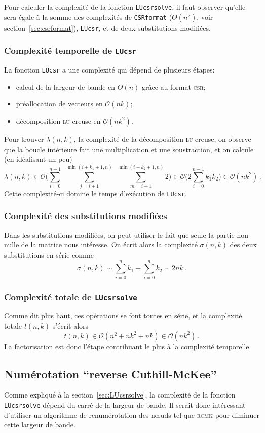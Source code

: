 \documentclass[11pt]{article}
\begin{document}
Pour calculer la complexité de la fonction \lstinline|LUcsrsolve|, il faut observer qu'elle sera égale à la somme des complexités de \lstinline|CSRformat| ($\Theta(n^2)$, voir section~\ref{sec:csrformat}), \lstinline|LUcsr|, et de deux substitutions modifiées.
\subsubsection{Complexité temporelle de \texttt{LUcsr}}
La fonction \lstinline|LUcsr| a une complexité qui dépend de plusieurs étapes:
\begin{itemize}
	\item calcul de la largeur de bande en $\Theta(n)$ grâce au format \textsc{csr};
	\item préallocation de vecteurs en $\mathcal{O}(nk)$;
	\item décomposition \textsc{lu} creuse en $\mathcal{O}(nk^2)$.
\end{itemize}
Pour trouver $\lambda(n, k)$, la complexité de la décomposition \textsc{lu} creuse, on observe que la boucle intérieure fait une multiplication et une soustraction, et on calcule (en idéalisant un peu)
\[
\lambda(n, k) \in \mathcal{O}\bigg(\sum_{i=0}^{n-1}\ \  \sum_{j = i+1}^{\min(i+k_1+1, n)} \ \ \sum_{m = i+1}^{\min(i+k_2+1, n)} 2\bigg) \in \mathcal{O}\bigg(2 \sum_{i=0}^{n-1} k_1 k_2\bigg) \in  \mathcal{O}(n k^2)\,.
\]
Cette complexité-ci domine le temps d'exécution de \lstinline|LUcsr|.
\subsubsection{Complexité des substitutions modifiées}
Dans les substitutions modifiées, on peut utiliser le fait que seule la partie non nulle de la matrice nous intéresse. On écrit alors la complexité $\sigma(n, k)$ des deux substitutions en série comme
\[
\sigma(n, k) \sim \sum_{i=0}^{n} k_1 + \sum_{i=0}^{n} k_2 \sim 2nk\,.
\]
\subsubsection{Complexité totale de \texttt{LUcsrsolve}}
Comme dit plus haut, ces opérations se font toutes en série, et la complexité totale $t(n, k)$ s'écrit alors
\[
t(n, k) \in \mathcal{O}(n^2 + nk^2 + nk) \in \mathcal{O}(nk^2)\,.
\]
La factorisation est donc l'étape contribuant le plus à la complexité temporelle.
\subsection{Numérotation \foreignquote{french}{reverse Cuthill-McKee}}
\label{sec:rcmk}
Comme expliqué à la section~\ref{sec:LUcsrsolve}, la complexité de la fonction \lstinline|LUcsrsolve| dépend du carré de la largeur de bande.
Il serait donc intéressant d'utiliser un algorithme de renumérotation des n\oe{}uds tel que \textsc{rcmk} pour diminuer cette largeur de bande.
\end{document}
